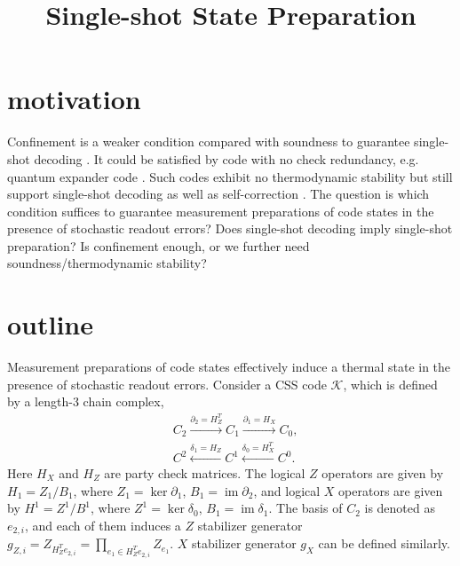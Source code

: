\documentclass[twoside,english,aps,showpacs,pra,superscriptaddress]{revtex4-2}
\DeclareMathOperator{\im}{im}
\begin{document}
\title{Single-shot State Preparation}  
\maketitle
\section{motivation}
Confinement is a weaker condition compared with soundness to guarantee single-shot decoding \cite{quintavalleSingleShotErrorCorrection2021}. It could be satisfied by code with no check redundancy, e.g. quantum expander code \cite{fawziConstantOverheadQuantum2018b}. Such codes exhibit no thermodynamic stability but still support single-shot decoding as well as self-correction \cite{hongQuantumMemoryNonzero2025a}. The question is which condition suffices to guarantee measurement preparations of code states in the presence of stochastic readout errors? Does single-shot decoding imply single-shot preparation? Is confinement enough, or we further need soundness/thermodynamic stability?

\section{outline}
Measurement preparations of code states effectively induce a thermal state in the presence of stochastic readout errors.
Consider a CSS code $\mathcal{K}$, which is defined by a length-3 chain complex,
\begin{equation}
\begin{aligned}
    &C_2 \xrightarrow{\partial_2 = H_Z^T} C_1 \xrightarrow{\partial_1 = H_X}C_0,\\
    &C^2 \xleftarrow{\delta_1 = H_Z} C^1 \xleftarrow{\delta_0 = H_X^T}C^0.
\end{aligned}
\end{equation}
Here $H_X$ and $H_Z$ are party check matrices. The logical $Z$ operators are given by $H_1 = Z_1/B_1$, where $Z_1=\ker \partial_1$, $B_1=\im \partial_2$, and logical $X$ operators are given by $H^1 = Z^1/B^1$, where $Z^1=\ker \delta_0$, $B_1=\im \delta_1$. The basis of $C_2$ is denoted as $e_{2,i}$, and each of them induces a $Z$ stabilizer generator $g_{Z,i} = Z_{H_Z^T e_{2,i}} = \prod_{e_1 \in H_Z^T e_{2,i}} Z_{e_1}$. $X$ stabilizer generator $g_X$ can be defined similarly. 
\end{document}
